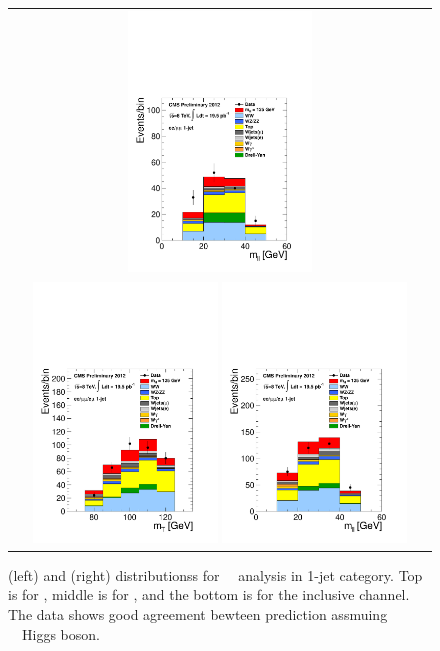 \begin{figure}[htp]
\begin{tabular}{c}
\includegraphics[width=0.45\textwidth]{figures/hww_analysis17_125_ALL_sf_1j_mll.pdf}
\\
\includegraphics[width=0.45\textwidth]{figures/hww_analysis17_125_ALL_incl_1j_mt.pdf}
\includegraphics[width=0.45\textwidth]{figures/hww_analysis17_125_ALL_incl_1j_mll.pdf}
\end{tabular} 
\caption{ \mT(left) and \mll(right) distributionss for ~\GeV\ analysis 
in 1-jet category. 
Top is for \DF, middle is for \SF, and the bottom is for the inclusive channel.  
The data shows good agreement bewteen prediction assmuing ~\GeV\ Higgs boson.} 
\label{fig:cutbased125_1jet} 
\end{figure} 

